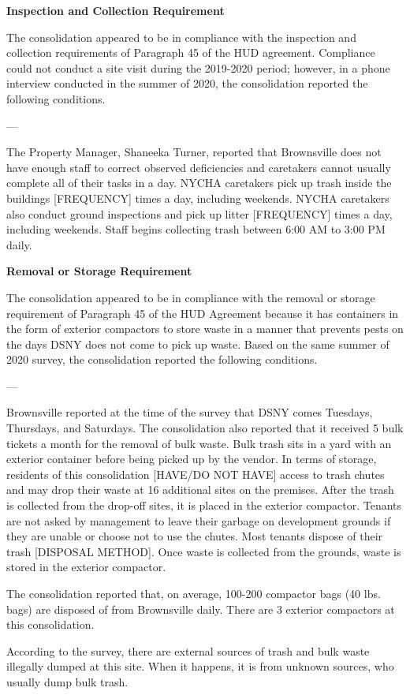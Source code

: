  

\textbf{Inspection and Collection Requirement} 

 

The consolidation appeared to be in compliance with the inspection and collection requirements of Paragraph 45 of the HUD agreement. Compliance could not conduct a site visit during the 2019-2020 period; however, in a phone interview conducted in the summer of 2020, the consolidation reported the following conditions.

--- 

The Property Manager, Shaneeka Turner, reported that Brownsville does not have enough staff to correct observed deficiencies and caretakers cannot usually complete all of their tasks in a day. NYCHA caretakers pick up trash inside the buildings [FREQUENCY] times a day, including weekends. NYCHA caretakers also conduct ground inspections and pick up litter [FREQUENCY] times a day, including weekends. Staff begins collecting trash between 6:00 AM to 3:00 PM daily.

 

\textbf{Removal or Storage Requirement} 

The consolidation appeared to be in compliance with the  removal or storage requirement of Paragraph  45 of the HUD Agreement because it has containers in the form of exterior compactors to store waste in a manner that prevents pests on the days DSNY does not come to pick up waste. Based on the same summer of  2020 survey, the consolidation reported the following conditions.

 

--- 

Brownsville reported at the time of the survey that DSNY comes Tuesdays, Thursdays, and Saturdays. The consolidation also reported that it received 5 bulk tickets a month for the removal of bulk waste. Bulk trash sits in a yard with an exterior container before being picked up by the vendor. In terms of storage, residents of this consolidation [HAVE/DO NOT HAVE] access to trash chutes and may drop their waste at 16 additional sites on the premises. After the trash is collected from the drop-off sites, it is placed in the exterior compactor. Tenants are not asked by management to leave their garbage on development grounds if they are unable or choose not to use the chutes. Most tenants dispose of their trash [DISPOSAL METHOD]. Once waste is collected from the grounds, waste is stored in the exterior compactor.  

 

The consolidation reported that, on average, 100-200 compactor bags (40 lbs. bags) are disposed of from Brownsville daily. There are 3 exterior compactors at this consolidation.

 

According to the survey, there are external sources of trash and bulk waste illegally dumped at this site. When it happens, it is from unknown sources, who usually dump bulk trash.